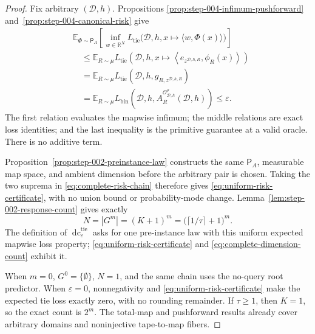 \begin{proof}
Fix arbitrary \((\mathcal D,h)\).  Propositions
\ref{prop:step-004-infimum-pushforward}
and~\ref{prop:step-004-canonical-risk} give
\[
\begin{aligned}
&\mathbb E_{\Phi\sim\mathsf P_A}
\left[
\inf_{w\in\mathbb R^N}
L_{\mathrm{tie}}\bigl(
\mathcal D,h,x\mapsto\langle w,\Phi(x)\rangle
\bigr)
\right]\\
&\quad\le\mathbb E_{R\sim\mu}
L_{\mathrm{tie}}\!\left(
\mathcal D,h,
x\mapsto\left\langle e_{z^{\mathcal D,h,R}},\phi_R(x)\right\rangle
\right)\\
&\quad=\mathbb E_{R\sim\mu}
L_{\mathrm{tie}}(\mathcal D,h,g_{R,z^{\mathcal D,h,R}})\\
&\quad=\mathbb E_{R\sim\mu}
L_{\mathrm{bin}}\!\left(
\mathcal D,h,
A_R^{\mathcal O^\rho_{\mathcal D,h}}(\mathcal D,h)
\right)
\le\varepsilon.
\end{aligned}
\tag{A.39}\label{eq:complete-risk-chain}
\]
The first relation evaluates the mapwise infimum; the middle relations are
exact loss identities; and the last inequality is the primitive guarantee
at a valid oracle.  There is no additive term.

Proposition~\ref{prop:step-002-preinstance-law} constructs the same
\(\mathsf P_A\), measurable map space, and ambient dimension before the
arbitrary pair is chosen.  Taking the two suprema in
\eqref{eq:complete-risk-chain} therefore gives
\eqref{eq:uniform-risk-certificate}, with no union bound or probability-mode
change.  Lemma~\ref{lem:step-002-response-count} gives exactly
\[
N=|G^m|=(K+1)^m
=\bigl(\lceil1/\tau\rceil+1\bigr)^m.
\tag{A.40}\label{eq:complete-dimension-count}
\]
The definition of \(\operatorname{dc}^{\mathrm{tie}}_\varepsilon\) asks
for one pre-instance law with this uniform expected mapwise loss property;
\eqref{eq:uniform-risk-certificate} and
\eqref{eq:complete-dimension-count} exhibit it.

When \(m=0\), \(G^0=\{\emptyset\}\), \(N=1\), and the same chain uses the
no-query root predictor.  When \(\varepsilon=0\), nonnegativity and
\eqref{eq:uniform-risk-certificate} make the expected tie loss exactly zero,
with no rounding remainder.  If \(\tau\ge1\), then \(K=1\), so the exact
count is \(2^m\).  The total-map and pushforward results already cover
arbitrary domains and noninjective tape-to-map fibers.
\end{proof}


